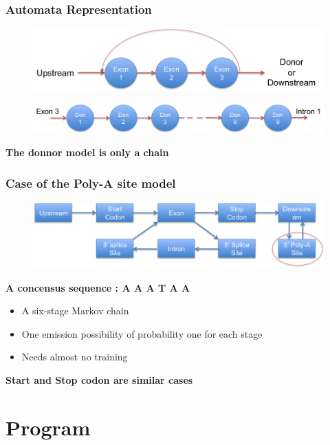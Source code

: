 \documentclass{beamer}
\begin{document}
\begin{frame}
\frametitle{Automata Representation}
	\begin{figure}
	\includegraphics[width=1.0\textwidth]{../picturesforthepresentation/exon_auto.png}
	\end{figure}
	\begin{figure}
	\includegraphics[width=1.0\textwidth]{../picturesforthepresentation/donnor_auto.png}
	\end{figure}
	\pause\begin{center}
		\textbf{The donnor model is only a chain}
	\end{center}
\end{frame}


\begin{frame}
\frametitle{Case of the Poly-A site model}
	\begin{figure}
	\includegraphics[width=1.0\textwidth]{../picturesforthepresentation/PolyA.png}
	\end{figure}
	
	\textbf{A concensus sequence : A A A T A A}
	
	\begin{itemize}
		\item A six-stage Markov chain
		\item One emission possibility of probability one for each stage 
		\item Needs almost no training 
	\end{itemize}
	
	\textbf{Start and Stop codon are similar cases}
	
	
\end{frame}
\section{Program}
\end{document}
